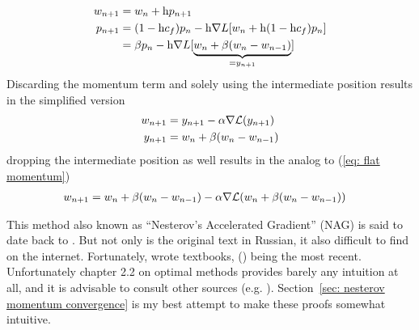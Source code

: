 \begin{definition}
	\label{def: nesterov's momentum}
	\begin{subequations}
	\begin{align}
		w_{n+1} &= w_n + \text{h} p_{n+1} \label{eq: nesterov momentum move}\\
		p_{n+1}
		&= (1-\text{h}c_f)p_n
		- \text{h}\nabla L[w_n + \text{h}(1-\text{h}c_f)p_n]
		\label{eq: nesterov momentum}
		\\ \nonumber
		&= \beta p_n
		- \text{h}\nabla L[\underbrace{
			w_n + \beta(w_n - w_{n-1})
		}_{= y_{n+1}}]
	\end{align}
	\end{subequations}
	Discarding the momentum term and solely using the intermediate position
	results in the simplified version
	\begin{subequations} \label{eq: nesterov intermediate position version}
	\begin{align}
		w_{n+1} &= y_{n+1} - \alpha \nabla \mathcal{L}(y_{n+1})\\
		y_{n+1}&= w_n + \beta(w_n - w_{n-1})
	\end{align}
	\end{subequations}
	dropping the intermediate position as well results in the analog to (\ref{eq:
	flat momentum})
	\begin{align}
		w_{n+1} &= w_n + \beta(w_n - w_{n-1})
		- \alpha \nabla \mathcal{L}(w_n + \beta(w_n - w_{n-1}))
	\end{align}
\end{definition}
%
\begin{remark}
	This method also known as ``Nesterov's Accelerated Gradient'' (NAG) is said
	to date back to \textcite{nesterovMethodSolvingConvex1983}.  But not only is
	the original text in Russian, it also difficult to find on the internet.
	Fortunately, \citeauthor{nesterovMethodSolvingConvex1983} wrote textbooks,
	(\citeyear{nesterovLecturesConvexOptimization2018}) being the most recent.
	Unfortunately chapter 2.2 on optimal methods provides barely any
	intuition at all, and it is advisable to consult other sources (e.g.
	\textcite{dontlooWhatDifferenceMomentum2016}). Section~\ref{sec: nesterov
	momentum convergence} is my best attempt to make these proofs somewhat
	intuitive.
 \end{remark}

